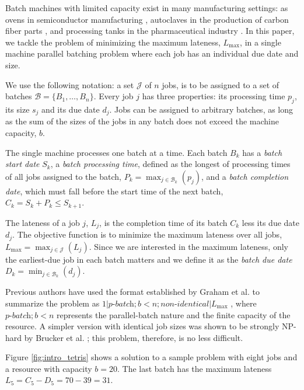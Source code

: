 \documentclass[oribibl]{llncs}
\def\Lmax{{L_{\mathrm{max}}}}
\begin{document}
Batch machines with limited capacity exist in many manufacturing
settings: as ovens in semiconductor manufacturing \cite{Lee}, autoclaves
in the production of carbon fiber parts \cite{Malapert}, and processing
tanks in the pharmaceutical industry \cite{Grossmann}. In this paper,
we tackle the problem of minimizing the maximum lateness, $\Lmax$,
in a single machine parallel batching problem where each job has an
individual due date and size.

We use the following notation: a set $\mathcal{J}$ of $n$ jobs,
is to be assigned to a set of batches $\mathcal{B} = \{B_1,\dots,B_n\}$. Every
job $j$ has three properties: its processing time $p_j$, its size $s_j$
and its due date $d_j$. Jobs can be assigned to arbitrary batches, as
long as the sum of the sizes of the jobs in any batch does not exceed
the machine capacity, $b$.

The single machine processes one batch at a time. Each batch $B_k$ has a
\textit{batch start date} $S_k$, a \textit{batch processing time},
defined as the longest of processing times of all jobs assigned to the
batch, $P_k = \max_{j\in \mathcal{B}_k}(p_j)$, and a \textit{batch completion
  date}, which must fall before the start time of the next batch, $C_k
= S_k + P_k \leq S_{k+1}$.

The lateness of a job $j$, $L_j$, is the completion time of its batch
$C_k$ less its due date $d_j$. The objective function is to minimize the
maximum lateness over all jobs, $\Lmax = \max_{j \in \mathcal{J}}(L_j)$. Since we
are interested in the maximum lateness, only the earliest-due job in
each batch matters and we define it as the \textit{batch due date}
$D_k = \min_{j\in \mathcal{B}_k}(d_j)$.

Previous authors have used the format established by Graham et al.
\cite{graham} to summarize the problem as $1|\textit{p-batch}; b
< n; \textit{non-identical}|\Lmax$ \cite{Daste, Malapert}, where
$\textit{p-batch};b<n$ represents the parallel-batch nature and the
finite capacity of the resource. A simpler version with identical job
sizes was shown to be strongly NP-hard by Brucker et al. \cite{Brucker};
this problem, therefore, is no less difficult.

Figure \ref{fig:intro_tetris} shows a solution to a sample
problem with eight jobs and a resource with capacity $b = 20$. The last batch
has the maximum lateness $L_5 = C_5 - D_5 = 70 - 39 = 31$.
\end{document}
